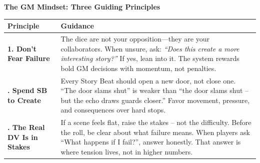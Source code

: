 \clearpage
\begin{tcolorbox}[colback=blue!5!white, colframe=blue!75!black, boxrule=0.5pt, arc=2mm, left=6pt, right=6pt, top=6pt, bottom=6pt]
\begin{center}
\textbf{\large The GM Mindset: Three Guiding Principles}
\end{center}
\medskip
\small
\begin{tabularx}{\textwidth}{>{\bfseries}p{} X}
\toprule
Principle & Guidance \\
\midrule
1. Don’t Fear Failure &
The dice are not your opposition—they are your collaborators.  
When unsure, ask: \emph{“Does this create a more interesting story?”}  
If yes, lean into it. The system rewards bold GM decisions with momentum, not penalties. \\
\addlinespace
2. Spend SB to Create &
Every Story Beat should open a new door, not close one.  
“The door slams shut” is weaker than “the door slams shut – but the echo draws guards closer.”  
Favor movement, pressure, and consequences over hard stops. \\
\addlinespace
3. The Real DV Is in Stakes &
If a scene feels flat, raise the stakes – not the difficulty.  
Before the roll, be clear about what failure means.  
When players ask “What happens if I fail?”, answer honestly.  
That answer is where tension lives, not in higher numbers. \\
\bottomrule
\end{tabularx}
\end{tcolorbox}

